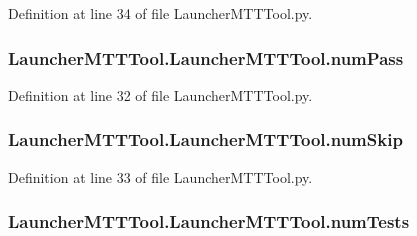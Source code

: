 Definition at line 34 of file Launcher\-M\-T\-T\-Tool.\-py.

\hypertarget{class_launcher_m_t_t_tool_1_1_launcher_m_t_t_tool_a92a3dc1fd9b7d2e9129d3a0968a871eb}{
\subsubsection[{num\-Pass}]{\setlength{\rightskip}{0pt plus 5cm}Launcher\-M\-T\-T\-Tool.\-Launcher\-M\-T\-T\-Tool.\-num\-Pass}}\label{class_launcher_m_t_t_tool_1_1_launcher_m_t_t_tool_a92a3dc1fd9b7d2e9129d3a0968a871eb}


Definition at line 32 of file Launcher\-M\-T\-T\-Tool.\-py.

\hypertarget{class_launcher_m_t_t_tool_1_1_launcher_m_t_t_tool_affd7de54ccbc2c7f78b4afa06728f5e5}{
\subsubsection[{num\-Skip}]{\setlength{\rightskip}{0pt plus 5cm}Launcher\-M\-T\-T\-Tool.\-Launcher\-M\-T\-T\-Tool.\-num\-Skip}}\label{class_launcher_m_t_t_tool_1_1_launcher_m_t_t_tool_affd7de54ccbc2c7f78b4afa06728f5e5}


Definition at line 33 of file Launcher\-M\-T\-T\-Tool.\-py.

\hypertarget{class_launcher_m_t_t_tool_1_1_launcher_m_t_t_tool_a397beae73724893629842d0031c64526}{
\subsubsection[{num\-Tests}]{\setlength{\rightskip}{0pt plus 5cm}Launcher\-M\-T\-T\-Tool.\-Launcher\-M\-T\-T\-Tool.\-num\-Tests}}\label{class_launcher_m_t_t_tool_1_1_launcher_m_t_t_tool_a397beae73724893629842d0031c64526}


